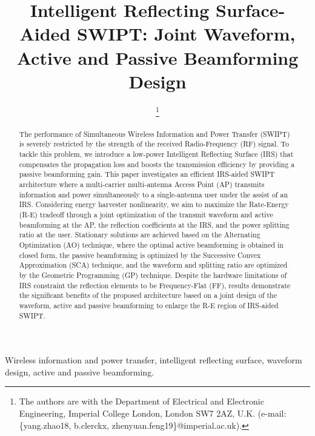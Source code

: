 \documentclass[journal]{IEEEtran}
\begin{document}
	\title{Intelligent Reflecting Surface-Aided SWIPT: Joint Waveform, Active and Passive Beamforming Design}
	\author{
		\thanks{
			The authors are with the Department of Electrical and Electronic Engineering, Imperial College London, London SW7 2AZ, U.K. (e-mail: \{yang.zhao18, b.clerckx, zhenyuan.feng19\}@imperial.ac.uk).
		}
	}
	\maketitle


	\begin{abstract}
		The performance of Simultaneous Wireless Information and Power Transfer (SWIPT) is severely restricted by the strength of the received Radio-Frequency (RF) signal. To tackle this problem, we introduce a low-power Intelligent Reflecting Surface (IRS) that compensates the propagation loss and boosts the transmission efficiency by providing a passive beamforming gain. This paper investigates an efficient IRS-aided SWIPT architecture where a multi-carrier multi-antenna Access Point (AP) transmits information and power simultaneously to a single-antenna user under the assist of an IRS. Considering energy harvester nonlinearity, we aim to maximize the Rate-Energy (R-E) tradeoff through a joint optimization of the transmit waveform and active beamforming at the AP, the reflection coefficients at the IRS, and the power splitting ratio at the user. Stationary solutions are achieved based on the Alternating Optimization (AO) technique, where the optimal active beamforming is obtained in closed form, the passive beamforming is optimized by the Successive Convex Approximation (SCA) technique, and the waveform and splitting ratio are optimized by the Geometric Programming (GP) technique. Despite the hardware limitations of IRS constraint the reflection elements to be Frequency-Flat (FF), results demonstrate the significant benefits of the proposed architecture based on a joint design of the waveform, active and passive beamforming to enlarge the R-E region of IRS-aided SWIPT.
	\end{abstract}


	\begin{IEEEkeywords}
		Wireless information and power transfer, intelligent reflecting surface, waveform design, active and passive beamforming.
	\end{IEEEkeywords}
\end{document}
